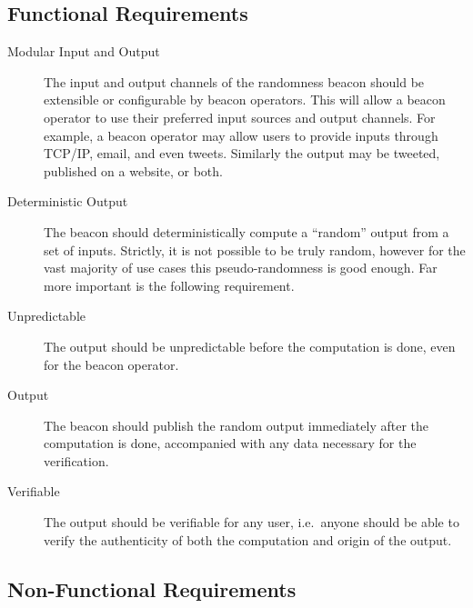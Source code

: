 \subsection{Functional Requirements}
\label{sub:functional_requirements}
\begin{description}
    \item[Modular Input and Output] The input and output channels of the randomness beacon should be extensible or configurable by beacon operators. This will allow a beacon operator to use their preferred input sources and output channels. For example, a beacon operator may allow users to provide inputs through TCP/IP, email, and even tweets. Similarly the output may be tweeted, published on a website, or both.

    \item[Deterministic Output] The beacon should deterministically compute a \enquote{random} output from a set of inputs. Strictly, it is not possible to be truly random, however for the vast majority of use cases this pseudo-randomness is good enough. Far more important is the following requirement.

    \item[Unpredictable] The output should be unpredictable before the computation is done, even for the beacon operator.


    \item[Output] The beacon should publish the random output immediately after the computation is done, accompanied with any data necessary for the verification.

    \item[Verifiable] The output should be verifiable for any user, i.e.\ anyone should be able to verify the authenticity of both the computation and origin of the output.
\end{description}

\subsection{Non-Functional Requirements}
\label{sub:non_functional_requirements}

